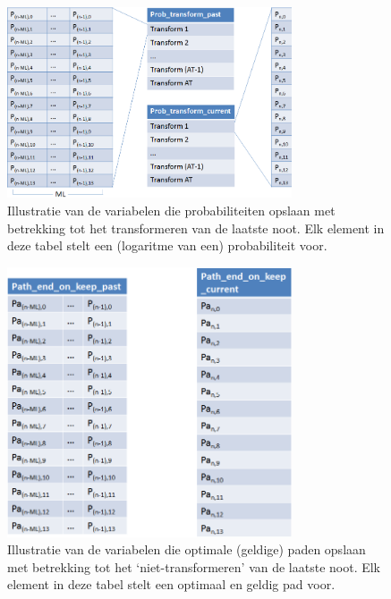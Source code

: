 \begin{figure}[!ht]
  \centering
  \includegraphics[width=0.75\textwidth]{4_Efficient_Toepassen_Transformatie/prob_transform_algo_2}
  \caption{Illustratie van de variabelen die probabiliteiten opslaan met betrekking tot het transformeren van de laatste noot. Elk element in deze tabel stelt een (logaritme van een) probabiliteit voor.}
  \label{figuur:prob_transform_algo_2}
\end{figure}

\begin{figure}[!ht]
  \centering
  \includegraphics[width=0.75\textwidth]{4_Efficient_Toepassen_Transformatie/path_keep_algo_2}
  \caption{Illustratie van de variabelen die optimale (geldige) paden opslaan met betrekking tot het `niet-transformeren' van de laatste noot. Elk element in deze tabel stelt een optimaal en geldig pad voor.}
  \label{figuur:path_keep_algo_2}
\end{figure}

